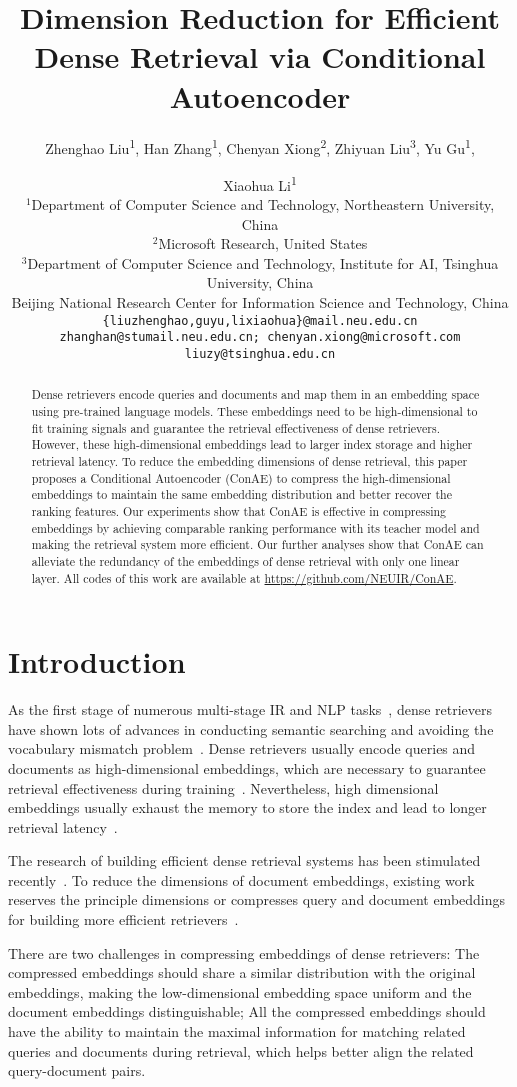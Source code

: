 \documentclass[11pt]{article}
\title{Dimension Reduction for Efficient Dense Retrieval via Conditional Autoencoder}
\author{Zhenghao Liu\textsuperscript{1}, 
        Han Zhang\textsuperscript{1}, 
        Chenyan Xiong\textsuperscript{2}, 
        Zhiyuan Liu\textsuperscript{3},
        Yu Gu\textsuperscript{1},
        \and Xiaohua Li\textsuperscript{1}\\
        $^1$Department of Computer Science and Technology, Northeastern University, China \\
        $^2$Microsoft Research, United States \\
        $^3$Department of Computer Science and Technology, Institute for AI, Tsinghua University, China \\
        Beijing National Research Center for Information Science and Technology, China \\
        \texttt{\{liuzhenghao,guyu,lixiaohua\}@mail.neu.edu.cn}\\
        \texttt{zhanghan@stumail.neu.edu.cn; chenyan.xiong@microsoft.com}\\
        \texttt{liuzy@tsinghua.edu.cn}}
\begin{document}
\maketitle
\begin{abstract}
Dense retrievers encode queries and documents and map them in an embedding space using pre-trained language models. These embeddings need to be high-dimensional to fit training signals and guarantee the retrieval effectiveness of dense retrievers. However, these high-dimensional embeddings lead to larger index storage and higher retrieval latency. To reduce the embedding dimensions of dense retrieval, this paper proposes a Conditional Autoencoder (ConAE) to compress the high-dimensional embeddings to maintain the same embedding distribution and better recover the ranking features. Our experiments show that ConAE is effective in compressing embeddings by achieving comparable ranking performance with its teacher model and making the retrieval system more efficient. Our further analyses show that ConAE can alleviate the redundancy of the embeddings of dense retrieval with only one linear layer. All codes of this work are available at \url{https://github.com/NEUIR/ConAE}.
\end{abstract}
\section{Introduction}
As the first stage of numerous multi-stage IR and NLP tasks~\cite{nogueira2019document,chen2017reading,thorne2018fact}, dense retrievers~\cite{xiong2020approximate} have shown lots of advances in conducting semantic searching and avoiding the vocabulary mismatch problem~\cite{robertson2009probabilistic}. Dense retrievers usually encode queries and documents as high-dimensional embeddings, which are necessary to guarantee retrieval effectiveness during training~\cite{ma2021simple,reimers2021curse}. Nevertheless, high dimensional embeddings usually exhaust the memory to store the index and lead to longer retrieval latency~\cite{indyk1998approximate,meiser1993point}.


The research of building efficient dense retrieval systems has been stimulated recently~\cite{effecientqa}. To reduce the dimensions of document embeddings, existing work reserves the principle dimensions or compresses query and document embeddings for building more efficient retrievers~\cite{yang2021designing,ma2021simple}.

There are two challenges in compressing embeddings of dense retrievers: The compressed embeddings should share a similar distribution with the original embeddings, making the low-dimensional embedding space uniform and the document embeddings distinguishable; All the compressed embeddings should have the ability to maintain the maximal information for matching related queries and documents during retrieval, which helps better align the related query-document pairs.
\end{document}
